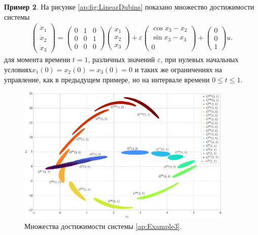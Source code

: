 \documentclass[../main.tex]{subfiles}
\begin{document}
   	 \textbf{Пример 2}. На рисунке \ref{ap:fig:LinearDubins} показано множество достижимости системы 
   \begin{gather}\label{ap:Linear+Dubins}
   	\begin{pmatrix} 
   		\dot{x}_1 \\
   		\dot{x}_2 \\ 
   		\dot{x}_3 \end{pmatrix} = 
   	\begin{pmatrix}
   		0 & 1 & 0 \\
   		0 & 0 & 1 \\
   		0 & 0 & 0
   	\end{pmatrix}
   	\begin{pmatrix} 
   		x_1 \\
   		x_2 \\ 
   		x_3 \end{pmatrix} + 
   	\varepsilon
   	\begin{pmatrix}
   		\cos x_3 - x_2\\
   		\sin x_3 - x_3 \\
   		0
   	\end{pmatrix} + 
   	\begin{pmatrix}
   		0 \\ 0 \\ 1
   	\end{pmatrix} u.
   \end{gather}
   	для момента времени $t = 1$, различных значений $\varepsilon$, при нулевых начальных условиях$x_1(0) = x_2(0) = x_3(0) = 0 $ и таких же ограничениях на управление, как в предыдущем примере, но на интервале времени $0 \leqslant t \leqslant 1$.
   	
   	\begin{figure}[t]
   		\centering
   			\includegraphics[width=0.92\textwidth]{images/Osipov_QuaziLinearExp.eps}
   		\caption{Множества достижимости системы \eqref{ap:Example3}.}
   		\label{ap:fig:QuaziLinearExp}
   	\end{figure}
  
\end{document}
